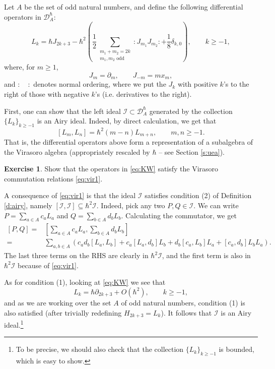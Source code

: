 \documentclass[reqno,oneside,11pt]{amsart}
\theoremstyle{plain}
\theoremstyle{definition}
\newtheorem*{exercise}{Exercise}
\theoremstyle{remark}
\numberwithin{equation}{section}
\newcommand{\I}{\mathcal{I}}
\newcommand{\DAh}{\mathcal{D}_A^{\hbar}}
\begin{document}
Let $A$ be the set of odd natural numbers, and define the following differential operators in $\DAh$:
\begin{equation}\label{eq:KW}
L_{k} = \hbar J_{2k+3}- \hbar^2 \left( \frac{1}{2}\sum_{\substack{m_1+m_2 = 2 k\\ m_1, m_2 \text{ odd}}} : J_{m_1} J_{m_2}: + \frac{1}{8}\delta_{k,0} \right), \qquad k \geq -1,
\end{equation}
where, for $m \geq 1$, 
\begin{equation}
J_m =\partial_m, \qquad J_{-m} = m x_m,
\end{equation}
and $: \quad :$ denotes normal ordering, where we put the $J_k$ with positive $k$'s to the right of those with negative $k$'s (i.e. derivatives to the right).

First, one can show that the left ideal $\I \subset \DAh$ generated by the collection $\{L_k\}_{k \geq -1}$ is an Airy ideal. Indeed, by direct calculation, we get that
\begin{equation}\label{eq:vir1}
[L_m, L_n] = \hbar^2 (m-n) L_{m+n}, \qquad m,n \geq -1.
\end{equation}
That is, the differential operators above form a representation of a subalgebra of the Virasoro algebra (appropriately rescaled by $\hbar$ -- see Section \ref{s:uea}). 

\begin{exercise}
Show that the operators in \eqref{eq:KW} satisfy the Virasoro commutation relations \eqref{eq:vir1}.
\end{exercise}

A consequence of \eqref{eq:vir1} is that the ideal $\I$ satisfies condition (2) of Definition \ref{d:airy}, namely $[\I,\I ] \subseteq \hbar^2 \I$. Indeed, pick any two $P, Q \in \I$. We can write $P = \sum_{a \in A} c_a L_a$ and $Q = \sum_{b \in A} d_b L_b$. Calculating the commutator, we get
\begin{align}\label{eq:calc}
[P,Q] =& [ \sum_{a \in A} c_a L_a, \sum_{b \in A} d_b L_b ]\\
=&\sum_{a,b \in A} \left( c_a d_b [L_a, L_b]+ c_a [ L_a, d_b] L_b + d_b [c_a, L_b] L_a + [c_a, d_b] L_b L_a \right).
\end{align}
The last three terms on the RHS are clearly in $\hbar^2 \I$, and the first term is also in $\hbar^2 \I$ because of \eqref{eq:vir1}.

As for condition (1), looking at \eqref{eq:KW} we see that
\begin{equation}
L_k = \hbar \partial_{2k+3} + O(\hbar^2), \qquad k \geq -1,
\end{equation}
and as we are working over the set $A$ of odd natural numbers, condition (1) is also satisfied (after trivially redefining $H_{2k+3} = L_k$). It follows that $\I$ is an Airy ideal.\footnote{To be precise, we should also check that the collection $\{ L_k \}_{k \geq -1}$ is bounded, which is easy to show.}
\end{document}
